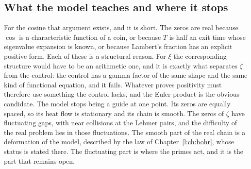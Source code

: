 \subsection{What the model teaches and where it stops}

For the cosine that argument exists, and it is short. The zeros are real because $\cos$ is a characteristic function of a coin, or because $T$ is half an exit time whose eigenvalue expansion is known, or because Lambert's fraction has an explicit positive form. Each of these is a structural reason. For $\xi$ the corresponding structure would have to be an arithmetic one, and it is exactly what separates $\zeta$ from the control: the control has a gamma factor of the same shape and the same kind of functional equation, and it fails. Whatever proves positivity must therefore use something the control lacks, and the Euler product is the obvious candidate.
The model stops being a guide at one point. Its zeros are equally spaced, so its heat flow is stationary and its chain is smooth. The zeros of $\zeta$ have fluctuating gaps, with near collisions at the Lehmer pairs, and the difficulty of the real problem lies in those fluctuations. The smooth part of the real chain is a deformation of the model, described by the law of Chapter~\ref{l:ch:bohr}, whose status is stated there. The fluctuating part is where the primes act, and it is the part that remains open.
